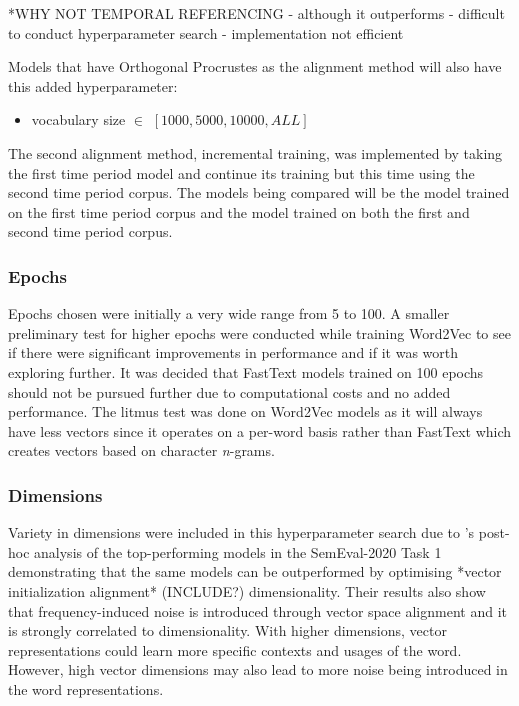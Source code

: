 *WHY NOT TEMPORAL REFERENCING
- although it outperforms 
- difficult to conduct hyperparameter search
- implementation not efficient 

Models that have Orthogonal Procrustes as the alignment method will also have this added hyperparameter:
\begin{itemize}
    \item vocabulary size $\in$ $[1000, 5000, 10000, ALL]$
\end{itemize}%

The second alignment method, incremental training, was implemented by taking the first time period model and continue its training but this time using the second time period corpus. The models being compared will be the model trained on the first time period corpus and the model trained on both the first and second time period corpus.

\subsubsection{Epochs} 
\label{exp-epochs}

Epochs chosen were initially a very wide range from 5 to 100. A smaller preliminary test for higher epochs were conducted while training Word2Vec to see if there were significant improvements in performance and if it was worth exploring further. It was decided that FastText models trained on 100 epochs should not be pursued further due to computational costs and no added performance. The litmus test was done on Word2Vec models as it will always have less vectors since it operates on a per-word basis rather than FastText which creates vectors based on character \emph{n}-grams. 

\subsubsection{Dimensions}
Variety in dimensions were included in this hyperparameter search due to \citet{kaiser-etal-2020-ims}’s post-hoc analysis of the top-performing models in the SemEval-2020 Task 1 demonstrating that the same models can be outperformed by optimising *vector initialization alignment* (INCLUDE?) dimensionality. Their results also show that frequency-induced noise is introduced through vector space alignment and it is strongly correlated to dimensionality. With higher dimensions, vector representations could learn more specific contexts and usages of the word. However, high vector dimensions may also lead to more noise being introduced in the word representations. 

